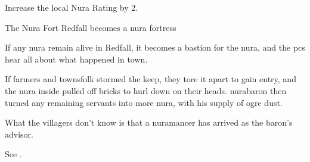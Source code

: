 Increase the local Nura Rating by 2.

{The Nura Fort}%
{Redfall becomes a nura fortress}%

If any nura remain alive in Redfall, it becomes a bastion for the nura, and the \glspl{pc} hear all about what happened in \gls{town}.

If farmers and townsfolk stormed the keep, they tore it apart to gain entry, and the nura inside pulled off bricks to hurl down on their heads.
\Gls{nurabaron} then turned any remaining servants into more nura, with his supply of ogre dust.

What the villagers don't know is that a nuramancer has arrived as the baron's advisor.

See .


